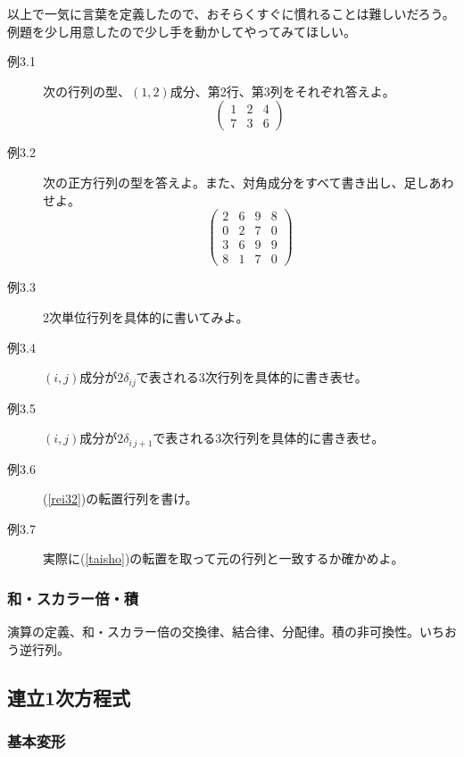 \documentclass[10pt]{jsarticle}
\numberwithin{equation}{section}%
\begin{document}
以上で一気に言葉を定義したので、おそらくすぐに慣れることは難しいだろう。例題を少し用意したので少し手を動かしてやってみてほしい。
\begin{description}
  \item[例3.1] 次の行列の型、$(1,2)$成分、第2行、第3列をそれぞれ答えよ。
  \begin{equation}
    \left( 
      \begin{matrix}
        1 & 2 & 4 \\
        7 & 3 & 6
      \end{matrix}
    \right)
  \end{equation}
  \item[例3.2] 次の正方行列の型を答えよ。また、対角成分をすべて書き出し、足しあわせよ。
  \begin{equation}
  \label{rei32}  \left( 
      \begin{matrix}
        2 & 6 & 9 & 8\\
        0 & 2 & 7 & 0 \\
        3 & 6 & 9 & 9 \\
        8 & 1 & 7 & 0
      \end{matrix}
    \right)
  \end{equation}
  \item[例3.3] 2次単位行列を具体的に書いてみよ。
  \item[例3.4] $(i,j)$成分が$2\delta_{ij}$で表される3次行列を具体的に書き表せ。 
  \item[例3.5] $(i,j)$成分が$2\delta_{i\, j+1}$で表される3次行列を具体的に書き表せ。 
  \item[例3.6] (\ref{rei32})の転置行列を書け。
  \item[例3.7] 実際に(\ref{taisho})の転置を取って元の行列と一致するか確かめよ。
\end{description}

\subsubsection{和・スカラー倍・積}

演算の定義、和・スカラー倍の交換律、結合律、分配律。積の非可換性。いちおう逆行列。

\subsection{連立1次方程式}
\subsubsection{基本変形}
\end{document}
